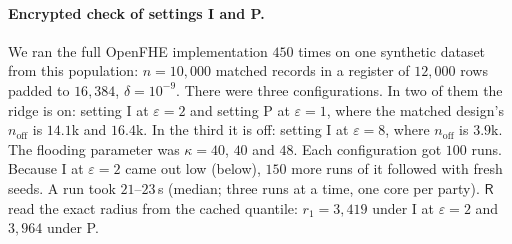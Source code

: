 \documentclass[11pt]{article}
\theoremstyle{definition}
\theoremstyle{plain}
\newcommand{\Party}[1]{\textsf{#1}}
\newcommand{\Rp}{\Party{R}}
\begin{document}
\paragraph{Encrypted check of settings I and P.} We ran the full OpenFHE implementation $450$ times on one synthetic dataset from this population: $n = 10{,}000$ matched records in a register of $12{,}000$ rows padded to $16{,}384$, $\delta = 10^{-9}$. There were three configurations. In two of them the ridge is on: setting I at $\varepsilon = 2$ and setting P at $\varepsilon = 1$, where the matched design's $n_{\mathrm{off}}$ is $14.1$k and $16.4$k. In the third it is off: setting I at $\varepsilon = 8$, where $n_{\mathrm{off}}$ is $3.9$k. The flooding parameter was $\kappa = 40$, $40$ and $48$. Each configuration got $100$ runs. Because I at $\varepsilon = 2$ came out low (below), $150$ more runs of it followed with fresh seeds. A run took $21$--$23$\,s (median; three runs at a time, one core per party). $\Rp$ read the exact radius from the cached quantile: $r_1 = 3{,}419$ under I at $\varepsilon = 2$ and $3{,}964$ under P.
\end{document}
